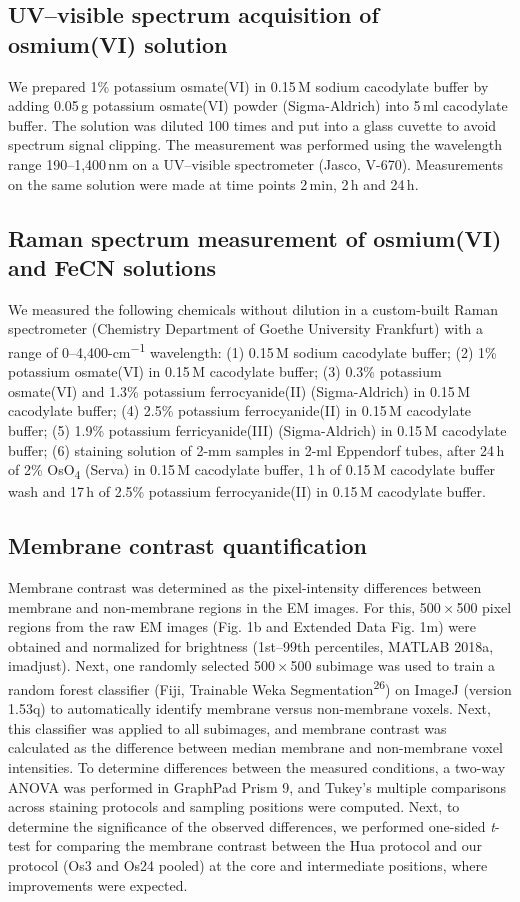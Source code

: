 \documentclass{article}
\begin{document}
\subsection*{UV–visible spectrum acquisition of osmium(VI) solution}
We prepared 1\% potassium osmate(VI) in 0.15\,M sodium cacodylate buffer by adding 0.05\,g potassium osmate(VI) powder (Sigma-Aldrich) into 5\,ml cacodylate buffer. The solution was diluted 100 times and put into a glass cuvette to avoid spectrum signal clipping. The measurement was performed using the wavelength range 190–1,400\,nm on a UV–visible spectrometer (Jasco, V-670). Measurements on the same solution were made at time points 2\,min, 2\,h and 24\,h.

\subsection*{Raman spectrum measurement of osmium(VI) and FeCN solutions}
We measured the following chemicals without dilution in a custom-built Raman spectrometer (Chemistry Department of Goethe University Frankfurt) with a range of 0–4,400-cm\textsuperscript{−1} wavelength: (1) 0.15\,M sodium cacodylate buffer; (2) 1\% potassium osmate(VI) in 0.15\,M cacodylate buffer; (3) 0.3\% potassium osmate(VI) and 1.3\% potassium ferrocyanide(II) (Sigma-Aldrich) in 0.15\,M cacodylate buffer; (4) 2.5\% potassium ferrocyanide(II) in 0.15\,M cacodylate buffer; (5) 1.9\% potassium ferricyanide(III) (Sigma-Aldrich) in 0.15\,M cacodylate buffer; (6) staining solution of 2-mm samples in 2-ml Eppendorf tubes, after 24\,h of 2\% OsO\textsubscript{4} (Serva) in 0.15\,M cacodylate buffer, 1\,h of 0.15\,M cacodylate buffer wash and 17\,h of 2.5\% potassium ferrocyanide(II) in 0.15\,M cacodylate buffer.

\subsection*{Membrane contrast quantification}
Membrane contrast was determined as the pixel-intensity differences between membrane and non-membrane regions in the EM images. For this, 500\,×\,500 pixel regions from the raw EM images (Fig. 1b and Extended Data Fig. 1m) were obtained and normalized for brightness (1st–99th percentiles, MATLAB 2018a, imadjust). Next, one randomly selected 500\,×\,500 subimage was used to train a random forest classifier (Fiji, Trainable Weka Segmentation\textsuperscript{26}) on ImageJ (version 1.53q) to automatically identify membrane versus non-membrane voxels. Next, this classifier was applied to all subimages, and membrane contrast was calculated as the difference between median membrane and non-membrane voxel intensities. To determine differences between the measured conditions, a two-way ANOVA was performed in GraphPad Prism 9, and Tukey’s multiple comparisons across staining protocols and sampling positions were computed. Next, to determine the significance of the observed differences, we performed one-sided \emph{t}-test for comparing the membrane contrast between the Hua protocol and our protocol (Os3 and Os24 pooled) at the core and intermediate positions, where improvements were expected.
\end{document}
